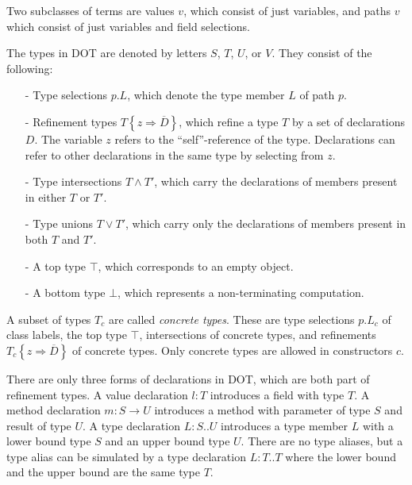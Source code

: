 \documentclass[9pt]{sigplanconf}
\newcommand{\tfun}{\rightarrow}
\newcommand{\tand}{\wedge}
\newcommand{\tor}{\vee}
\newcommand{\refine}[2]{\left\{#1 \Rightarrow #2 \right\}}
\newcommand{\seq}[1]{\overline{#1}}
\newcommand{\Ldecl}[3]{#1 : #2..#3}%
\newcommand{\ldecl}[2]{#1 : #2}
\newcommand{\mdecl}[3]{#1 : #2 \tfun #3}
\newcommand{\Top}{\top}%
\newcommand{\Bot}{\bot}%
\begin{document}
Two subclasses of terms are values $v$, which consist of just
variables, and paths $v$ which consist of just variables and field
selections.

The types in DOT are denoted by letters $S$, $T$, $U$, or $V$. They consist of the following:
\begin{itemize}
\item[-] Type selections $p.L$, which denote the type member $L$ of path $p$.
\item[-] Refinement types $T \refine z {\seq D}$, which refine a type $T$ by a set of declarations $D$.
         The variable $z$ refers to the ``self''-reference of the type. Declarations can refer to
         other declarations in the same type by selecting from $z$.
\item[-] Type intersections $T \tand T'$, which carry the declarations of members present in either $T$ or $T'$.
\item[-] Type unions $T \tor T'$, which carry only the declarations of members present in both $T$ and $T'$.
\item[-] A top type $\Top$, which corresponds to an empty object.
\item[-] A bottom type $\Bot$, which represents a non-terminating computation.
\end{itemize}
A subset of types $T_c$ are called {\em concrete types}. These are type selections
$p.L_c$ of class labels,
the top type $\Top$, intersections of concrete types, and refinements $T_c \refine z {\seq D}$ of concrete types. Only concrete types are allowed in constructors $c$.

There are only three forms of declarations in DOT, which are both part
of refinement types.  A value declaration $\ldecl l T$ introduces a
field with type $T$.  A method declaration $\mdecl m S U$ introduces a
method with parameter of type $S$ and result of type $U$. A type
declaration $\Ldecl L S U$ introduces a type member $L$ with a lower
bound type $S$ and an upper bound type $U$. There are no type aliases,
but a type alias can be simulated by a type declaration $\Ldecl L T T$
where the lower bound and the upper bound are the same type $T$.
\end{document}
